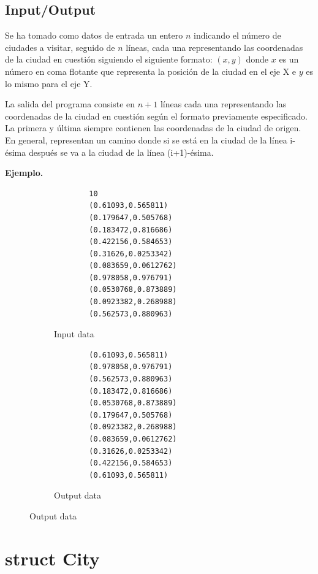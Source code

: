 \documentclass{article}
\begin{document}
\subsection{Input/Output}

Se ha tomado como datos de entrada un entero $n$ indicando el número de ciudades a visitar, seguido de $n$ líneas, cada
una representando las coordenadas de la ciudad en cuestión
siguiendo el siguiente formato: $(x,y)$ donde $x$ es un 
número en coma flotante que representa la posición de la ciudad
en el eje X e $y$ es lo mismo para el eje Y.

La salida del programa consiste en $n+1$ líneas cada una 
representando las coordenadas de la ciudad en cuestión según el
formato previamente especificado. La primera y última
siempre contienen las coordenadas de la ciudad de origen.
En general, representan un camino donde si se está en la 
ciudad de la línea i-ésima después se va a la ciudad de 
la línea (i+1)-ésima.

\textbf{Ejemplo.}
    \begin{figure}[H]
    \centering
    \begin{subfigure}{0.45\textwidth}
    \begin{verbatim}
        10
        (0.61093,0.565811)
        (0.179647,0.505768)
        (0.183472,0.816686)
        (0.422156,0.584653)
        (0.31626,0.0253342)
        (0.083659,0.0612762)
        (0.978058,0.976791)
        (0.0530768,0.873889)
        (0.0923382,0.268988)
        (0.562573,0.880963)
    \end{verbatim}
    \caption{Input data}
    \end{subfigure}
    \begin{subfigure}{0.45\textwidth}
    \begin{verbatim}
        (0.61093,0.565811)
        (0.978058,0.976791)
        (0.562573,0.880963)
        (0.183472,0.816686)
        (0.0530768,0.873889)
        (0.179647,0.505768)
        (0.0923382,0.268988)
        (0.083659,0.0612762)
        (0.31626,0.0253342)
        (0.422156,0.584653)
        (0.61093,0.565811)
    \end{verbatim}
    \caption{Output data}
    \end{subfigure}
\end{figure}

\newpage

\section{struct City}
\end{document}
